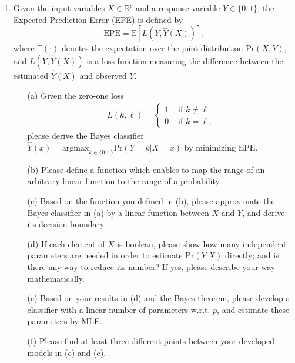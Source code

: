 \documentclass[10pt]{article}
\begin{document}
\begin{enumerate}[1.]
        \item  Given the input variables $X \in \mathbb{R}^p$ and a response variable $Y \in \{ 0,1 \}$, the Expected Prediction Error (EPE) is defined by 
		\begin{equation*}
		\text{EPE} = \mathbb{E}[L(Y,\hat{Y}(X))],
		\end{equation*}
        where $\mathbb{E}(\cdot)$ denotes the expectation over the joint distribution $\text{Pr}(X,Y)$, and $L(Y,\hat{Y}(X))$ is a loss 
        function measuring the difference between the estimated $\hat{Y}(X)$ and observed $Y$.
		\begin{itemize}
            \item[(a)] Given the zero-one loss
                        \begin{align*}
                            L(k,\ell)=\left\{\begin{array}{ll}
                                1 & \text { if } k \neq \ell \\
                                0 & \text { if } k = \ell,
                            \end{array}\right.
                        \end{align*}
            please derive the Bayes classifier $\hat{Y}(x) = \text{argmax}_{k \in \{ 0,1\}} \text{Pr}(Y=k|X=x)$ by minimizing $\text{EPE}$.~ 
            \item[(b)] Please define a function which enables to map the range of an arbitrary linear function to the range of a probability. ~
            \item[(c)] Based on the function you defined in (b), please approximate the Bayes classifier in (a)
            by a linear function between $X$ and $Y$, and derive its decision boundary. ~
        \item[(d)] If each element of $X$ is boolean, please show how many independent parameters are needed in order to estimate $\text{Pr}(Y|X)$ directly;
        and is there any way to reduce its number? If yes, please describe your way mathematically. ~  
        \item[(e)] Based on your results in (d) and the Bayes theorem, please develop a classifier with a linear number of parameters w.r.t. $p$, 
        and estimate these parameters by MLE. ~
        \item[(f)] Please find at least three different points between your developed models in (c) and (e). ~   
        \end{itemize}








\end{enumerate}
\end{document}
